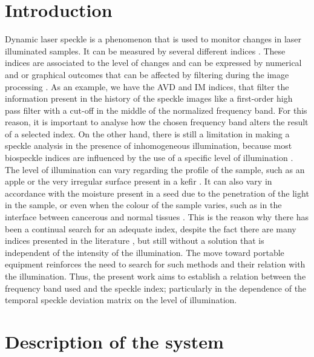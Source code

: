 \documentclass[review]{elsarticle}
\begin{document}
\section{Introduction}
Dynamic laser speckle is a phenomenon that is used to monitor changes in laser illuminated samples. It can be measured by several different indices \cite{BSLTLBOOK}. These indices are associated to the level of changes and can be expressed by numerical and or graphical outcomes that can be affected by filtering during the image processing \cite{RIVERA2017144}. As an example, we have  the AVD \cite{avd} and 
IM \cite{ARIZAGA1999163} indices, that filter
the information present in the history of the speckle images like a first-order high pass filter with a cut-off in the middle
of the normalized frequency band.
For this reason, it is important to analyse how
the chosen frequency band alters the result of a selected index.
On the other hand, there is still a limitation in making a speckle analysis in the presence of inhomogeneous illumination, because
most biospeckle indices are influenced
by the use of a specific level of illumination \cite{REIS2016}.
The level of illumination can vary regarding the profile of the sample, such as an apple \cite{KAZ:12a} or the very irregular surface present in a kefir \cite{kefir}.
It can also vary in accordance with the moisture present in a seed \cite{CARDOSO2011} due to the penetration of the light in the sample, or even when the colour of the sample varies, such as in the interface between cancerous and normal tissues \cite{BCB+:12a}.
This is the reason why there has been a continual search for an adequate index, despite the fact there are many indices presented in the literature \cite{BSLTLBOOK}, but still without a solution that is independent of the intensity of the illumination.
The move toward portable equipment \cite{Bra:17} reinforces the need to search for such methods and their relation with the illumination.
Thus, the present work aims to establish a relation between the frequency band used
and the speckle index; particularly in the dependence of
the temporal speckle deviation matrix \cite{Nothdurft:05} on the level of illumination.


\section{Description of the system}
\label{sec:description}
\end{document}
